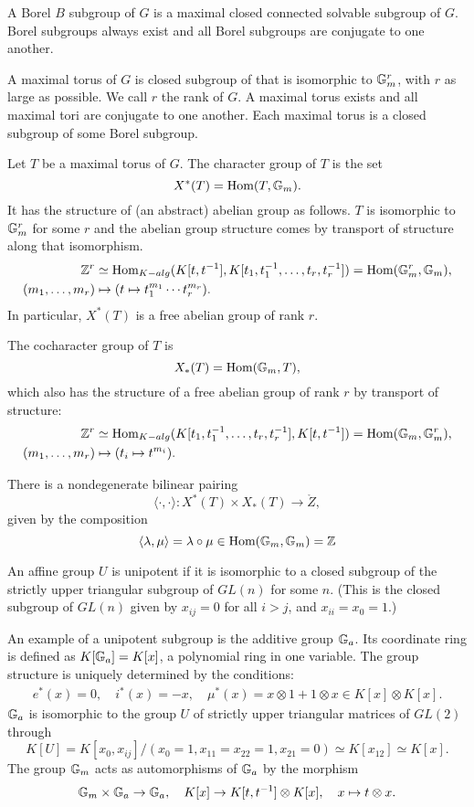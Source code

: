 A Borel $B$ subgroup of $G$ is a maximal closed connected solvable
subgroup of $G$.  Borel subgroups always exist and all Borel subgroups
are conjugate to one another.

A maximal torus of $G$ is closed subgroup of that is isomorphic to
${\Bbb G}_m^r$, with $r$ as large as possible.  We call $r$ the rank
of $G$.  A maximal torus exists and all maximal tori are conjugate to
one another.  Each maximal torus is a closed subgroup of some Borel
subgroup.

Let $T$ be a maximal torus of $G$.  The character group of $T$
is the set
\[
X^*(T) = \text{Hom}(T,{\Bbb G}_m).
\]
It has the structure of (an abstract) abelian group as follows.  $T$
is isomorphic to ${\Bbb G}_m^r$ for some $r$ and the abelian group
structure comes by transport of structure along that isomorphism.
\begin{align*}
{\Bbb Z}^r &\simeq
\text{Hom}_{K-alg}(K[t,t^{-1}],K[t_1,t_1^{-1},\ldots,t_r,t_r^{-1}])
= \text{Hom}({\Bbb G}_m^r,{\Bbb G}_m),\\
(m_1,\ldots,m_r)&\mapsto (t\mapsto t_1^{m_1}\cdots t_r^{m_r}).
\end{align*}
In particular, $X^*(T)$ is a free abelian group of rank $r$.

The cocharacter group of $T$ is
\[
X_*(T) = \text{Hom}({\Bbb G}_m,T),
\]
which also has the structure of a free abelian group of rank $r$
by transport of structure:
\begin{align*}
{\Bbb Z}^r &\simeq
\text{Hom}_{K-alg}(K[t_1,t_1^{-1},\ldots,t_r,t_r^{-1}],K[t,t^{-1}])
= \text{Hom}({\Bbb G}_m,{\Bbb G}_m^r),\\
(m_1,\ldots,m_r)&\mapsto (t_i\mapsto t^{m_i}).
\end{align*}

There is a nondegenerate bilinear pairing
\[
\langle\cdot,\cdot\rangle:X^*(T)\times X_*(T)\to \ring{Z},
\]
given by the composition
\[
\langle \lambda,\mu\rangle =
\lambda\circ\mu \in \text{Hom}({\Bbb G}_m,{\Bbb G}_m) = {\Bbb Z}
\]


An affine group $U$ is unipotent if it is isomorphic to a closed
subgroup of the strictly upper triangular subgroup of $GL(n)$ for some
$n$.  (This is the closed subgroup of $GL(n)$ given by $x_{ij}=0$ for
all $i>j$, and $x_{ii}=x_0 = 1$.)

An example of a unipotent subgroup is the additive group ${\Bbb G}_a$.
Its coordinate ring is defined as $K[{\Bbb G}_a] = K[x]$, a polynomial
ring in one variable.  The group structure is uniquely determined by
the conditions:
\begin{align*}
  e^*(x)=0,\quad i^*(x)= -x,\quad
  \mu^*(x) = x\otimes 1 + 1\otimes x\in K[x]\otimes K[x].
\end{align*}
${\Bbb G}_a$ is isomorphic to the group $U$ of strictly upper
triangular matrices of $GL(2)$ through
\[
K[U]= K[x_0,x_{ij}]/(x_0=1,x_{11}=x_{22}=1,x_{21}=0)
\simeq K[x_{12}] \simeq K[x].
\]
The group ${\Bbb G}_m$ acts as automorphisms of ${\Bbb G}_a$ by the
morphism
\[
{\Bbb G}_m\times {\Bbb G}_a\to {\Bbb G}_a,\quad K[x]\to K[t,t^{-1}]\otimes K[x],
\quad x\mapsto t\otimes x.
\]

